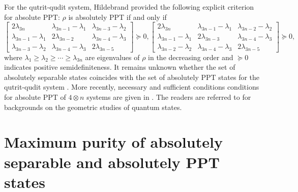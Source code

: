 \documentclass[reqno, 12pt,a4letter]{amsart}
\theoremstyle{definition}
\theoremstyle{plain}
\begin{document}
For the qutrit-qudit system,  Hildebrand \cite[Corollary V.3]{Hildebrand2007} provided the following explicit criterion for absolute PPT: $\rho$ is absolutely PPT if and only if
{\small 
	\begin{equation} \label{Eq3}
		\begin{bmatrix}
			2\lambda_{3n} & \lambda_{3n-1} - \lambda_1 & \lambda_{3n-3} - \lambda_2\\
			\lambda_{3n-1} - \lambda_1 & 2\lambda_{3n-2} & \lambda_{3n-4} - \lambda_3\\
			\lambda_{3n-3} - \lambda_2 & \lambda_{3n-4} - \lambda_3 & 2\lambda_{3n-5}
		\end{bmatrix} \succeq 0,
		\begin{bmatrix}
			2\lambda_{3n} & \lambda_{3n-1} - \lambda_1 & \lambda_{3n-2} - \lambda_2\\
			\lambda_{3n-1} - \lambda_1 & 2\lambda_{3n-3} & \lambda_{3n-4} - \lambda_3\\
			\lambda_{3n-2} - \lambda_2 & \lambda_{3n-4} - \lambda_3 & 2\lambda_{3n-5}
		\end{bmatrix} \succeq 0, 
\end{equation} }
where $\lambda_1 \ge \lambda_2 \ge \cdots \ge \lambda_{3n}$ are eigenvalues of $\rho$ in the decreasing order and $\succeq 0$ indicates positive semidefiniteness.
It remains unknown whether the set of absolutely separable states coincides with the set of absolutely PPT states for the qutrit-qudit system \cite{Arunachalam2015}.  More recently, necessary and sufficient conditions conditions for absolute PPT of $4\otimes n$ systems are given in \cite{Xiong2024}. The readers are referred to \cite{Bengtsson2009, Aubrun2017} for backgrounds on the geometric studies of quantum states.
\section{Maximum purity of absolutely separable and absolutely PPT states}
\end{document}
